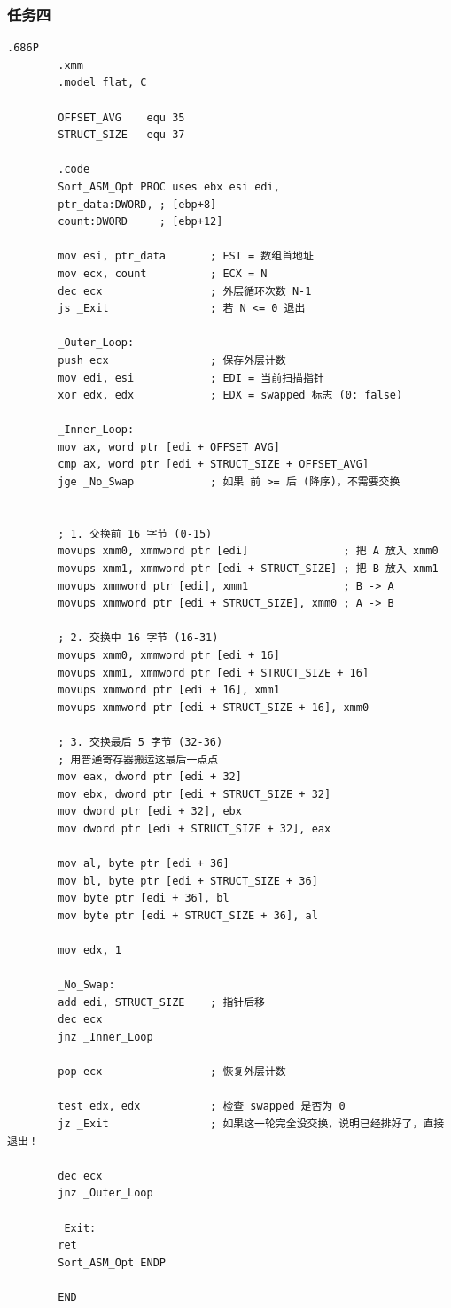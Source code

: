 \documentclass[supercite]{Experimental_Report}
\theoremstyle{definition}
\begin{document}
	\subsubsection{任务四}
	\begin{lstlisting}[style=commonCodeStyle, caption={task4.asm}, label={lst:7-7}]
		.686P
		.xmm               
		.model flat, C
		
		OFFSET_AVG    equ 35
		STRUCT_SIZE   equ 37
		
		.code
		Sort_ASM_Opt PROC uses ebx esi edi,
		ptr_data:DWORD, ; [ebp+8]
		count:DWORD     ; [ebp+12]
		
		mov esi, ptr_data       ; ESI = 数组首地址
		mov ecx, count          ; ECX = N
		dec ecx                 ; 外层循环次数 N-1
		js _Exit                ; 若 N <= 0 退出
		
		_Outer_Loop:
		push ecx                ; 保存外层计数
		mov edi, esi            ; EDI = 当前扫描指针
		xor edx, edx            ; EDX = swapped 标志 (0: false)
		
		_Inner_Loop:
		mov ax, word ptr [edi + OFFSET_AVG]
		cmp ax, word ptr [edi + STRUCT_SIZE + OFFSET_AVG]
		jge _No_Swap            ; 如果 前 >= 后 (降序)，不需要交换
		
		
		; 1. 交换前 16 字节 (0-15)
		movups xmm0, xmmword ptr [edi]               ; 把 A 放入 xmm0
		movups xmm1, xmmword ptr [edi + STRUCT_SIZE] ; 把 B 放入 xmm1
		movups xmmword ptr [edi], xmm1               ; B -> A
		movups xmmword ptr [edi + STRUCT_SIZE], xmm0 ; A -> B
		
		; 2. 交换中 16 字节 (16-31)
		movups xmm0, xmmword ptr [edi + 16]
		movups xmm1, xmmword ptr [edi + STRUCT_SIZE + 16]
		movups xmmword ptr [edi + 16], xmm1
		movups xmmword ptr [edi + STRUCT_SIZE + 16], xmm0
		
		; 3. 交换最后 5 字节 (32-36)
		; 用普通寄存器搬运这最后一点点
		mov eax, dword ptr [edi + 32]
		mov ebx, dword ptr [edi + STRUCT_SIZE + 32]
		mov dword ptr [edi + 32], ebx
		mov dword ptr [edi + STRUCT_SIZE + 32], eax
		
		mov al, byte ptr [edi + 36]
		mov bl, byte ptr [edi + STRUCT_SIZE + 36]
		mov byte ptr [edi + 36], bl
		mov byte ptr [edi + STRUCT_SIZE + 36], al
		
		mov edx, 1
		
		_No_Swap:
		add edi, STRUCT_SIZE    ; 指针后移
		dec ecx
		jnz _Inner_Loop
		
		pop ecx                 ; 恢复外层计数
		
		test edx, edx           ; 检查 swapped 是否为 0
		jz _Exit                ; 如果这一轮完全没交换，说明已经排好了，直接退出！
		
		dec ecx
		jnz _Outer_Loop
		
		_Exit:
		ret
		Sort_ASM_Opt ENDP
		
		END	
		
	\end{lstlisting}
	
	
	
	
	
\end{document}
